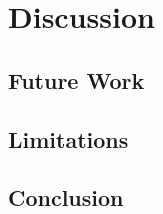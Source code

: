 \section{Discussion}
\label{sec:discussion}

\subsection{Future Work}
\label{sec:futurework}

\subsection{Limitations}
\label{sec:limitations}


\subsection{Conclusion}
\label{sec:conclusion}

